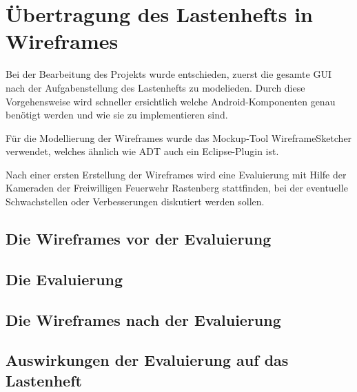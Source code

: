 \section{\"Ubertragung des Lastenhefts in Wireframes}
{\color{red}
Bei der Bearbeitung des Projekts wurde entschieden, zuerst die gesamte GUI nach der Aufgabenstellung des Lastenhefts zu modelieden. Durch diese Vorgehensweise wird schneller ersichtlich welche Android-Komponenten genau ben\"otigt werden und wie sie zu implementieren sind.

F\"ur die Modellierung der Wireframes wurde das Mockup-Tool WireframeSketcher verwendet, welches \"ahnlich wie \ac{ADT} auch ein Eclipse-Plugin ist. 

Nach einer ersten Erstellung der Wireframes wird eine Evaluierung mit Hilfe der Kameraden der Freiwilligen Feuerwehr Rastenberg stattfinden, bei der eventuelle Schwachstellen oder Verbesserungen diskutiert werden sollen.
}
\subsection{Die Wireframes vor der Evaluierung}

\subsection{Die Evaluierung}

\subsection{Die Wireframes nach der Evaluierung}

\subsection{Auswirkungen der Evaluierung auf das Lastenheft}